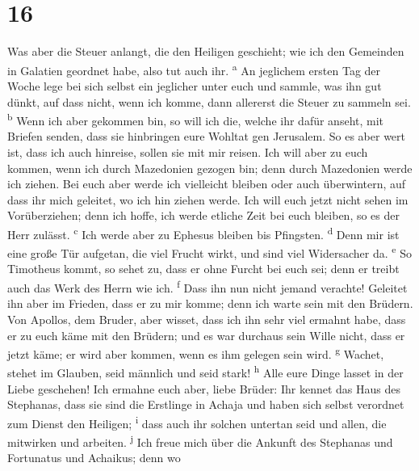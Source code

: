 \hypertarget{section-15}{%
\section{16}\label{section-15}}

 Was aber die Steuer anlangt, die den Heiligen geschieht;
wie ich den Gemeinden in Galatien geordnet habe, also tut auch ihr.
\textsuperscript{a}  An jeglichem ersten Tag der Woche
lege bei sich selbst ein jeglicher unter euch und sammle, was ihn gut
dünkt, auf dass nicht, wenn ich komme, dann allererst die Steuer zu
sammeln sei. \textsuperscript{b}  Wenn ich aber gekommen
bin, so will ich die, welche ihr dafür anseht, mit Briefen senden, dass
sie hinbringen eure Wohltat gen Jerusalem.  So es aber
wert ist, dass ich auch hinreise, sollen sie mit mir reisen.
 Ich will aber zu euch kommen, wenn ich durch Mazedonien
gezogen bin; denn durch Mazedonien werde ich ziehen.  Bei
euch aber werde ich vielleicht bleiben oder auch überwintern, auf dass
ihr mich geleitet, wo ich hin ziehen werde.  Ich will euch
jetzt nicht sehen im Vorüberziehen; denn ich hoffe, ich werde etliche
Zeit bei euch bleiben, so es der Herr zulässt. \textsuperscript{c}
 Ich werde aber zu Ephesus bleiben bis Pfingsten.
\textsuperscript{d}  Denn mir ist eine große Tür aufgetan,
die viel Frucht wirkt, und sind viel Widersacher da. \textsuperscript{e}
 So Timotheus kommt, so sehet zu, dass er ohne Furcht bei
euch sei; denn er treibt auch das Werk des Herrn wie ich.
\textsuperscript{f}  Dass ihn nun nicht jemand verachte!
Geleitet ihn aber im Frieden, dass er zu mir komme; denn ich warte sein
mit den Brüdern.  Von Apollos, dem Bruder, aber wisset,
dass ich ihn sehr viel ermahnt habe, dass er zu euch käme mit den
Brüdern; und es war durchaus sein Wille nicht, dass er jetzt käme; er
wird aber kommen, wenn es ihm gelegen sein wird. \textsuperscript{g}
 Wachet, stehet im Glauben, seid männlich und seid stark!
\textsuperscript{h}  Alle eure Dinge lasset in der Liebe
geschehen!  Ich ermahne euch aber, liebe Brüder: Ihr
kennet das Haus des Stephanas, dass sie sind die Erstlinge in Achaja und
haben sich selbst verordnet zum Dienst den Heiligen; \textsuperscript{i}
 dass auch ihr solchen untertan seid und allen, die
mitwirken und arbeiten. \textsuperscript{j}  Ich freue
mich über die Ankunft des Stephanas und Fortunatus und Achaikus; denn wo
